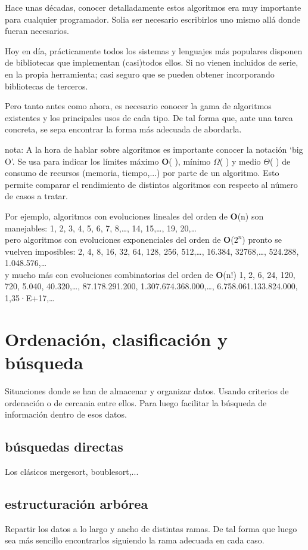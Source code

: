 \documentclass[spanish,12pt,a4paper,final,oneside]{book}
\begin{document}
Hace unas décadas, conocer detalladamente estos algoritmos era muy importante para cualquier programador. Solia ser necesario escribirlos uno mismo allá donde fueran necesarios. 

Hoy en día, prácticamente todos los sistemas y lenguajes más populares disponen de bibliotecas que implementan (casi)todos ellos. Si no vienen incluidos de serie, en la propia herramienta; casi seguro que se pueden obtener incorporando bibliotecas de terceros.

Pero tanto antes como ahora, es necesario conocer la gama de algoritmos existentes y los principales usos de cada tipo. De tal forma que, ante una tarea concreta, se sepa encontrar la forma más adecuada de abordarla. 

nota: A la hora de hablar sobre algoritmos es importante conocer la notación `big O'. Se usa para indicar los límites máximo \textbf{O}( ), mínimo \textbf{$\Omega$}( ) y medio \textbf{$\Theta$}( ) de consumo de recursos (memoria, tiempo,...) por parte de un algoritmo. Esto permite comparar el rendimiento de distintos algoritmos con respecto al número de casos a tratar.

Por ejemplo, algoritmos con evoluciones lineales del orden de \textbf{O}(n) son manejables: 1, 2, 3, 4, 5, 6, 7, 8,\ldots, 14, 15,\ldots, 19, 20,\ldots 
\\pero algoritmos con evoluciones exponenciales del orden de \textbf{O}($2^n$) pronto se vuelven  imposibles: 2, 4, 8, 16, 32, 64, 128, 256, 512,\ldots, 16.384, 32768,\ldots, 524.288, 1.048.576,\ldots 
\\y mucho más con evoluciones combinatorias del orden de \textbf{O}(n!)  1, 2, 6, 24, 120, 720, 5.040, 40.320,\ldots, 87.178.291.200, 1.307.674.368.000,\ldots, 6.758.061.133.824.000, 1,35·E+17,\ldots

\section{Ordenación, clasificación y búsqueda}
Situaciones donde se han de almacenar y organizar datos.  Usando criterios de ordenación o de cercania entre ellos. Para luego facilitar la búsqueda de información dentro de esos datos.

\subsection{búsquedas directas}
Los clásicos mergesort, boublesort,...

\subsection{estructuración arbórea}
Repartir los datos a lo largo y ancho de distintas ramas. De tal forma que luego sea más sencillo encontrarlos siguiendo la rama adecuada en cada caso.
\end{document}
